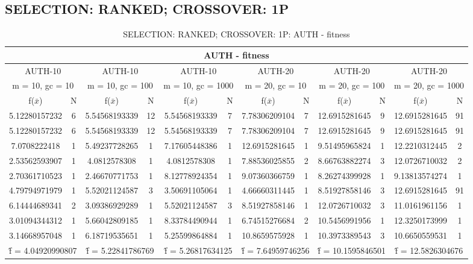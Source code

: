 \subsection{SELECTION: RANKED; CROSSOVER: 1P}
\begin{table}[H]
	\centering
	\caption{SELECTION: RANKED; CROSSOVER: 1P: AUTH - fitness}
	\begin{adjustbox}{width=1\textwidth}
		\begin{tabular}{ |c|c||c|c||c|c||c|c||c|c||c|c| }
			\hline
			\multicolumn{12}{|c|}{AUTH - fitness} \\
			\hline
			\multicolumn{2}{|c||}{AUTH-10} & \multicolumn{2}{c||}{AUTH-10} & \multicolumn{2}{c||}{AUTH-10} & \multicolumn{2}{c||}{AUTH-20} & \multicolumn{2}{c||}{AUTH-20} & \multicolumn{2}{c|}{AUTH-20}\\
			\hline
			\multicolumn{2}{|c||}{m = 10, gc = 10} & \multicolumn{2}{c||}{m = 10, gc = 100} & \multicolumn{2}{c||}{m = 10, gc = 1000} & \multicolumn{2}{c||}{m = 20, gc = 10} & \multicolumn{2}{c||}{m = 20, gc = 100} & \multicolumn{2}{c|}{m = 20, gc = 1000}\\
			\hline
			f($\bar{x}$) & N & f($\bar{x}$) & N & f($\bar{x}$) & N & f($\bar{x}$) & N & f($\bar{x}$) & N & f($\bar{x}$) & N\\
			\hline
			\hline
			5.12280157232 & 6 & 5.54568193339 & 12 & 5.54568193339 & 7 & 7.78306209104 & 7 & 12.6915281645 & 9 & 12.6915281645 & 91\\
			\hline
			5.12280157232 & 6 & 5.54568193339 & 12 & 5.54568193339 & 7 & 7.78306209104 & 7 & 12.6915281645 & 9 & 12.6915281645 & 91\\
			7.0708222418 & 1 & 5.49237728265 & 1 & 7.17605448386 & 1 & 12.6915281645 & 1 & 9.51495965824 & 1 & 12.2210312445 & 2\\
			2.53562593907 & 1 & 4.0812578308 & 1 & 4.0812578308 & 1 & 7.88536025855 & 2 & 8.66763882274 & 3 & 12.0726710032 & 2\\
			2.70361710523 & 1 & 2.46670771753 & 1 & 8.12778924354 & 1 & 9.07360366759 & 1 & 8.26274399928 & 1 & 9.13813574274 & 1\\
			4.79794971979 & 1 & 5.52021124587 & 3 & 3.50691105064 & 1 & 4.66660311445 & 1 & 8.51927858146 & 3 & 12.6915281645 & 91\\
			6.14444689341 & 2 & 3.09386929289 & 1 & 5.52021124587 & 3 & 8.51927858146 & 1 & 12.0726710032 & 3 & 11.0161961156 & 1\\
			3.01094344312 & 1 & 5.66042809185 & 1 & 8.33784490944 & 1 & 6.74515276684 & 2 & 10.5456991956 & 1 & 12.3250173999 & 1\\
			3.14668957048 & 1 & 6.18719535651 & 1 & 5.25599864884 & 1 & 10.8659575928 & 1 & 10.3973389543 & 3 & 10.6650559531 & 1\\
			\hline
			\multicolumn{2}{|c||}{\^{f} = 4.04920990807} & \multicolumn{2}{c||}{\^{f} = 5.22841786769} & \multicolumn{2}{c||}{\^{f} = 5.26817634125} & \multicolumn{2}{c||}{\^{f} = 7.64959746256} & \multicolumn{2}{c||}{\^{f} = 10.1595846501} & \multicolumn{2}{c|}{\^{f} = 12.5826304676}\\
			\hline
		\end{tabular}
	\end{adjustbox}
\end{table}

